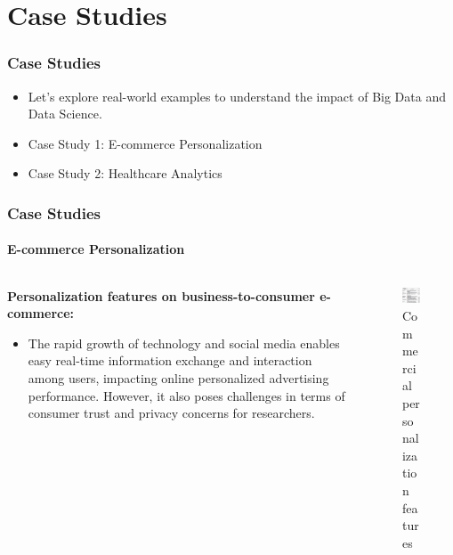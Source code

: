 \documentclass{beamer}
\begin{document}
\section{Case Studies}
	\begin{frame}
	\frametitle{Case Studies}
		\begin{itemize}
  			\item Let's explore real-world examples to understand the impact of Big Data and Data Science.
  			\item Case Study 1: E-commerce Personalization
  			\item Case Study 2: Healthcare Analytics
		\end{itemize}
	\end{frame}
	\begin{frame}
	\frametitle{Case Studies}
	\framesubtitle{E-commerce Personalization}
		\begin{columns}
			\begin{column}{0.5\textwidth}
				\textbf{Personalization features on business-to-consumer e-commerce:}
				\begin{itemize}
  					\item The rapid growth of technology and social media enables easy real-time information exchange and interaction among users, impacting online personalized advertising performance. However, it also poses challenges in terms of consumer trust and privacy concerns for researchers.
				\end{itemize}
			\end{column}
			\begin{column}{0.5\textwidth}
				\begin{figure}
        		\includegraphics[width=\linewidth]{resources/CommercialPersonalization.png} %
        		\caption{Commercial personalization features}
      			\end{figure}
			\end{column}
		\end{columns}
	\end{frame}
\end{document}
